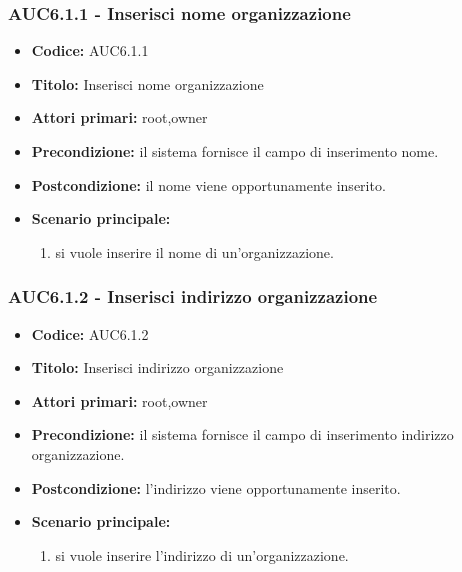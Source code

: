 \documentclass[casi-duso]{subfiles}
\begin{document}
  \subsubsection{AUC6.1.1 - Inserisci nome organizzazione}%
  \label{subsub:AUC6.1.1}
  \begin{itemize}
    \item \textbf{Codice:} AUC6.1.1
    \item \textbf{Titolo:} Inserisci nome organizzazione
    \item \textbf{Attori primari:} root,owner
    \item \textbf{Precondizione:} il sistema fornisce il campo di inserimento nome.
    \item \textbf{Postcondizione:} il nome viene opportunamente inserito.
    \item \textbf{Scenario principale:} 
    \begin{enumerate}
      \item si vuole inserire il nome di un'organizzazione.
    \end{enumerate}
    
  \end{itemize}
  
  \subsubsection{AUC6.1.2 - Inserisci indirizzo organizzazione}%
  \label{subsub:AUC6.1.2}
  \begin{itemize}
    \item \textbf{Codice:} AUC6.1.2
    \item \textbf{Titolo:} Inserisci indirizzo organizzazione
    \item \textbf{Attori primari:} root,owner
    \item \textbf{Precondizione:} il sistema fornisce il campo di inserimento indirizzo organizzazione.
    \item \textbf{Postcondizione:} l'indirizzo viene opportunamente inserito.
    \item \textbf{Scenario principale:}
    \begin{enumerate}
      \item si vuole inserire l'indirizzo di un'organizzazione.
    \end{enumerate}
  \end{itemize}
  
\end{document}
